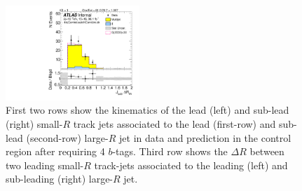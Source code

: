 \begin{figure}[htbp!]
\begin{center}
\includegraphics[angle=270, width=0.45\textwidth]{./figures/boosted/Control/b77_FourTag_Control_sublHCand_trk_dr.pdf}
  \caption{First two rows show the kinematics of the lead (left) and sub-lead (right) small-$R$ track jets associated to the lead (first-row) and sub-lead (second-row) large-$R$ jet in data and prediction in the control region after requiring 4 $b$-tags. Third row shows the $\Delta R$ between two leading small-$R$ track-jets associated to the leading (left) and sub-leading (right) large-$R$ jet.  }
  \label{fig:boosted-4b-control-ak2}
\end{center}
\end{figure}


